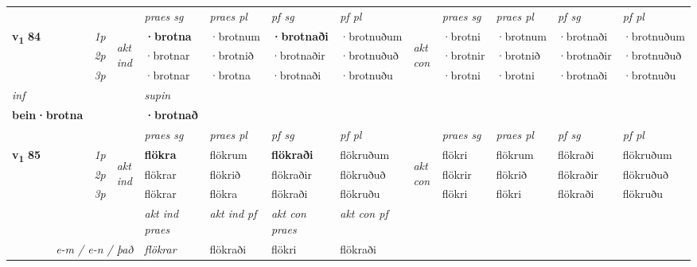 \begin{longtable}[l]{X>{\footnotesize\itshape}llXXXXlXXXX}
 & &   & \textit{praes sg}  & \textit{praes pl}    & \textit{ pf sg} & \textit{pf pl} & & \textit{praes sg}  & \textit{praes pl}    & \textit{pf sg} & \textit{pf pl }  \\ \cmidrule{4-7} \cmidrule{9-12}
 \multirow{2}{*}{{{\textbf{v{\textsubscript{1}}} \Large{\textbf{84}}}}}  & 1p & \multirow{3}{*}{\begin{turn}{90}\textit{akt ind}\end{turn}} & \textbf{·brotna} & ·brotnum & \textbf{·brotnaði} & ·brotnuðum & \multirow{3}{*}{\begin{turn}{90}\textit{akt con}\end{turn}} &·brotni & ·brotnum & ·brotnaði & ·brotnuðum\\*
 & 2p &  &  ·brotnar  & ·brotnið & ·brotnaðir & ·brotnuðuð & & ·brotnir & ·brotnið & ·brotnaðir & ·brotnuðuð \\*
 & 3p &  & ·brotnar & ·brotna & ·brotnaði & ·brotnuðu & & ·brotni & ·brotni& ·brotnaði & ·brotnuðu \\*
\cmidrule{4-7} \cmidrule{9-12}

   {\textit{inf}} & &      & \textit{supin}   \\*
  {\textbf{bein\allowbreak ·brotna}} & &      &  \textbf{·brotnað}   \\*

\midrule

 & &   & \textit{praes sg}  & \textit{praes pl}    & \textit{ pf sg} & \textit{pf pl} & & \textit{praes sg}  & \textit{praes pl}    & \textit{pf sg} & \textit{pf pl }  \\ \cmidrule{4-7} \cmidrule{9-12}
 \multirow{2}{*}{{{\textbf{v{\textsubscript{1}}} \Large{\textbf{85}}}}}  & 1p & \multirow{3}{*}{\begin{turn}{90}\textit{akt ind}\end{turn}} & \textbf{flökra} & flökrum & \textbf{flökraði} & flökruðum & \multirow{3}{*}{\begin{turn}{90}\textit{akt con}\end{turn}} &flökri & flökrum & flökraði & flökruðum\\*
 & 2p &  &  flökrar  & flökrið & flökraðir & flökruðuð & & flökrir & flökrið & flökraðir & flökruðuð \\*
 & 3p &  & flökrar & flökra & flökraði & flökruðu & & flökri & flökri& flökraði & flökruðu \\*
\cmidrule{4-7} \cmidrule{9-12}

   && &  \textit{akt ind praes} & \textit{akt ind pf} & \textit{akt con praes} & \textit{akt con pf} \\*
\multicolumn{3}{r}{\textit{e-m  /  e-n / það}} & flökrar & flökraði & flökri & flökraði \\*


\end{longtable}
